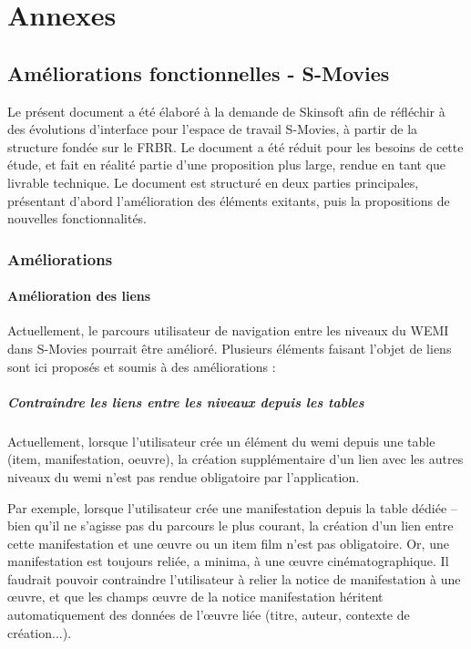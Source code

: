 \appendix
\part*{Annexes}	
\setcounter{chapter}{0}

\chapter{\label{annexe_A}Améliorations fonctionnelles - S-Movies}

Le présent document a été élaboré à la demande de Skinsoft afin de réfléchir à des évolutions d'interface pour l'espace de travail S-Movies, à partir de la structure fondée sur le \gls{FRBR}. Le document a été réduit pour les besoins de cette étude, et fait en réalité partie d'une proposition plus large, rendue en tant que livrable technique.
Le document est structuré en deux parties principales, présentant d'abord l'amélioration des éléments exitants, puis la propositions de nouvelles fonctionnalités. 


\section{Améliorations}  

\subsection{Amélioration des liens} 

Actuellement, le parcours utilisateur de navigation entre les niveaux du WEMI dans S-Movies pourrait être amélioré. Plusieurs éléments faisant l’objet de liens sont ici proposés et soumis à des améliorations :  

\subsubsection{Contraindre les liens entre les niveaux depuis les tables} 

Actuellement, lorsque l’utilisateur crée un élément du \gls{wemi} depuis une table (\gls{item}, \gls{manifestation}, \gls{oeuvre}), la création supplémentaire d’un lien avec les autres niveaux du \gls{wemi} n’est pas rendue obligatoire par l’application.  

Par exemple, lorsque l’utilisateur crée une \gls{manifestation} depuis la table dédiée –bien qu’il ne s’agisse pas du parcours le plus courant, la création d’un lien entre cette \gls{manifestation} et une œuvre ou un \gls{item} film n’est pas obligatoire. Or, une \gls{manifestation} est toujours reliée, a minima, à une œuvre cinématographique. Il faudrait pouvoir contraindre l’utilisateur à relier la notice de \gls{manifestation} à une œuvre, et que les champs œuvre de la notice \gls{manifestation} héritent automatiquement des données de l’œuvre liée (titre, auteur, contexte de création...). 

